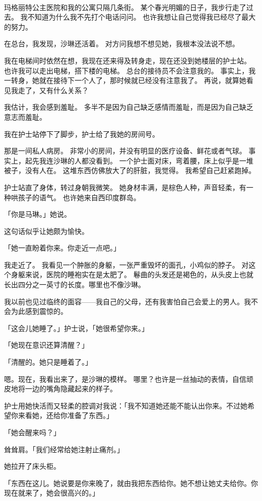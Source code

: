 \documentclass[UTF8]{ctexart}
\begin{document}
~\\

玛格丽特公主医院和我的公寓只隔几条街。
某个春光明媚的日子，我步行走了过去。
我不知道为什么我不先打个电话问问。
也许我想让自己觉得我已经尽了最大的努力。

在总台，我发现，沙琳还活着。
对方问我想不想见她，我根本没法说不想。

我在电梯间时依然在想，我现在还来得及转身走，现在还没到她楼层的护士站。
也许我可以走出电梯，搭下楼的电梯。
总台的接待员不会注意我的。
事实上，我一转身，她就在接待下一个人了，那时候就已经没有注意我了。
再说，就算她看见我走了，又有什么关系？

我估计，我会感到羞耻。
多半不是因为自己缺乏感情而羞耻，而是因为自己缺乏意志而羞耻。

我在护士站停下了脚步，护士给了我她的房间号。

那是一间私人病房。
非常小的房间，并没有明显的医疗设备、鲜花或者气球。
事实上，起先我连沙琳的人都没看到。
一个护士面对床，弯着腰，床上似乎是一堆被子，没有人在。
这堆东西仿佛放大了的肝脏，我觉得。
我希望自己赶紧跑掉。

护士站直了身体，转过身朝我微笑。
她身材丰满，是棕色人种，声音轻柔，有一种哄孩子的语气。
也许她来自西印度群岛。

「你是马琳。」她说。

这句话似乎让她颇为愉快。

「她一直盼着你来。你走近一点吧。」

我走近了。
我看见一个肿胀的身躯，一张严重毁坏的面孔，小鸡似的脖子。
对这个身躯来说，医院的睡袍实在是太肥了。
鬈曲的头发还是褐色的，从头皮上也就长出四分之一英寸的长度。哪里也不像沙琳。

我以前也见过临终的面容——我自己的父母，还有我害怕自己会爱上的男人。我不会为此感到震惊的。

「这会儿她睡了。」护士说，「她很希望你来。」

「她现在意识还算清醒？」

「清醒的。她只是睡着了。」

嗯。现在，我看出来了，是沙琳的模样。
哪里？也许是一丝抽动的表情，自信顽皮地将一边的嘴角隐藏起来的样子。

护士用她快活而又轻柔的腔调对我说：「我不知道她还能不能认出你来。不过她希望你来看她，还给你准备了东西。」

「她会醒来吗？」

耸耸肩。「我们经常给她注射止痛剂。」

她拉开了床头柜。

「东西在这儿。她说要是你来晚了，就由我把东西给你。她不想让她丈夫给你。你现在就来了，她会很高兴的。」
\end{document}
